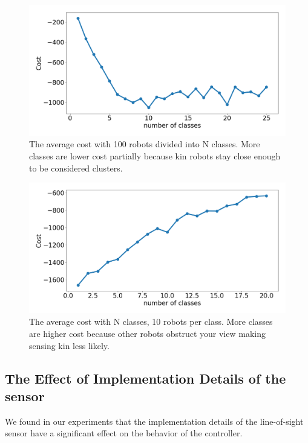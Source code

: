\documentclass[conference]{IEEEtran}
\begin{document}
    \begin{figure}[H]
      \centering
      \includegraphics[width=1\linewidth]{./images/num_classes_vs_cost_100_robots.png}
      \caption{The average cost with 100 robots divided into N classes. More classes are lower cost partially because kin robots stay close enough to be considered clusters.}
      \label{fig:num_classes_100}
    \end{figure}

    \begin{figure}[H]
      \centering
      \includegraphics[width=1\linewidth]{./images/num_classes_vs_cost_10_per_class.png}
      \caption{The average cost with N classes, 10 robots per class. More classes are higher cost because other robots obstruct your view making sensing kin less likely.}
      \label{fig:num_classes_10}
    \end{figure}

  \subsection{The Effect of Implementation Details of the sensor} \label{section:sensor_impl}

    We found in our experiments that the implementation details of the line-of-sight sensor have a significant effect on the behavior of the controller.
\end{document}
